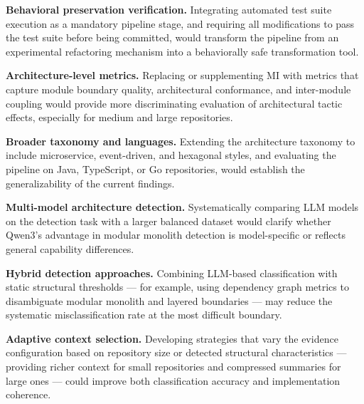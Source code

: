 \textbf{Behavioral preservation verification.} Integrating automated test suite execution as a mandatory pipeline stage, and requiring all modifications to pass the test suite before being committed, would transform the pipeline from an experimental refactoring mechanism into a behaviorally safe transformation tool.

\textbf{Architecture-level metrics.} Replacing or supplementing MI with metrics that capture module boundary quality, architectural conformance, and inter-module coupling would provide more discriminating evaluation of architectural tactic effects, especially for medium and large repositories.

\textbf{Broader taxonomy and languages.} Extending the architecture taxonomy to include microservice, event-driven, and hexagonal styles, and evaluating the pipeline on Java, TypeScript, or Go repositories, would establish the generalizability of the current findings.

\textbf{Multi-model architecture detection.} Systematically comparing LLM models on the detection task with a larger balanced dataset would clarify whether Qwen3's advantage in modular monolith detection is model-specific or reflects general capability differences.

\textbf{Hybrid detection approaches.} Combining LLM-based classification with static structural thresholds — for example, using dependency graph metrics to disambiguate modular monolith and layered boundaries — may reduce the systematic misclassification rate at the most difficult boundary.

\textbf{Adaptive context selection.} Developing strategies that vary the evidence configuration based on repository size or detected structural characteristics — providing richer context for small repositories and compressed summaries for large ones — could improve both classification accuracy and implementation coherence.
